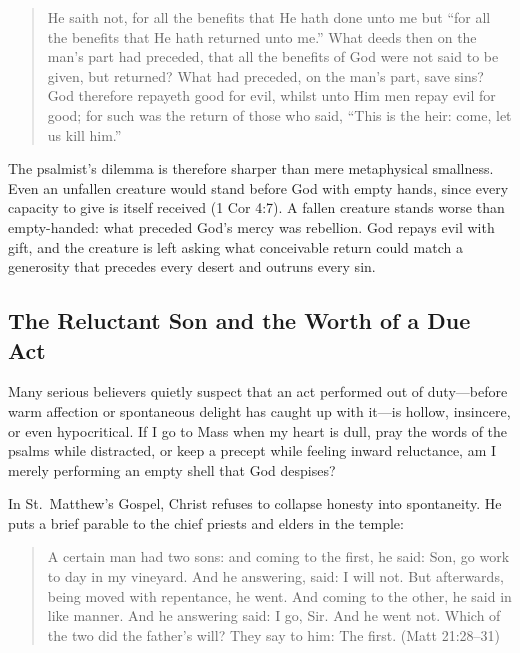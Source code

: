 \begin{quote}
He saith not, for all the benefits that He hath done unto me but ``for all the benefits that He hath returned unto me.'' What deeds then on the man's part had preceded, that all the benefits of God were not said to be given, but returned? What had preceded, on the man's part, save sins? God therefore repayeth good for evil, whilst unto Him men repay evil for good; for such was the return of those who said, ``This is the heir: come, let us kill him.''
\end{quote}

The psalmist's dilemma is therefore sharper than mere metaphysical smallness. Even an unfallen creature would stand before God with empty hands, since every capacity to give is itself received (1 Cor 4:7). A fallen creature stands worse than empty-handed: what preceded God's mercy was rebellion. God repays evil with gift, and the creature is left asking what conceivable return could match a generosity that precedes every desert and outruns every sin.

\subsection{The Reluctant Son and the Worth of a Due Act}

Many serious believers quietly suspect that an act performed out of duty---before warm affection or spontaneous delight has caught up with it---is hollow, insincere, or even hypocritical. If I go to Mass when my heart is dull, pray the words of the psalms while distracted, or keep a precept while feeling inward reluctance, am I merely performing an empty shell that God despises?

In St.\ Matthew's Gospel, Christ refuses to collapse honesty into spontaneity. He puts a brief parable to the chief priests and elders in the temple:

\begin{quote}
A certain man had two sons: and coming to the first, he said: Son, go work to day in my vineyard. And he answering, said: I will not. But afterwards, being moved with repentance, he went. And coming to the other, he said in like manner. And he answering said: I go, Sir. And he went not. Which of the two did the father's will? They say to him: The first. (Matt 21:28--31)
\end{quote}

